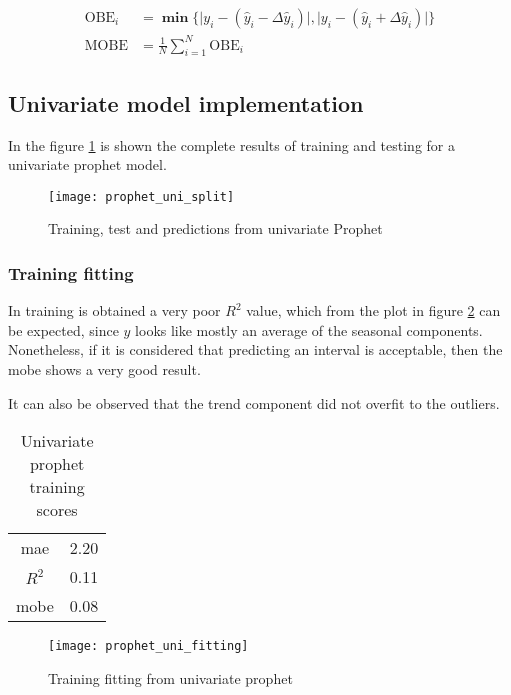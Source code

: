 \begin{align}
\text{OBE}_i &= \bm{\min} \Big\{ \big| y_i - (\hat{y}_i - \Delta\hat{y}_i) \big| , \big	| y_i - (\hat{y}_i + \Delta\hat{y}_i) \big| \Big\} \label{eq:obe} \\
\text{MOBE} &= \frac{1}{N} \sum_{i=1}^{N}{ \text{OBE}_i }\label{eq:mobe}
\end{align}

\subsection{Univariate model implementation}

In the figure \ref{fig:prophet_uni_split} is shown the complete results of training and testing for a univariate prophet model.

\begin{figure}[H]
	\centering
	\texttt{[image: prophet\_uni\_split]}
	\caption{Training, test and predictions from univariate Prophet}
	\label{fig:prophet_uni_split}
\end{figure}

\subsubsection*{Training fitting}

In training is obtained a very poor $R^2$ value, which from the plot in figure \ref{fig:prophet_uni_fitting} can be expected, since $\hat{y}$ looks like mostly an average of the seasonal components. Nonetheless, if it is considered that predicting an interval is acceptable, then the \ac{mobe} shows a very good result. 

It can also be observed that the trend component did not overfit to the outliers.

\begin{table}[H]
	\centering
	\begin{tabular}{|c|c|}
		\hline
		\ac{mae} 	& 2.20 \\
		$R^2$ 		& 0.11 \\
		\ac{mobe} 	& 0.08 \\
		\hline
	\end{tabular}
	\caption{Univariate prophet training scores}
	\label{table:prophet_uni_train_scores}
\end{table}

\begin{figure}[H]
	\centering
	\texttt{[image: prophet\_uni\_fitting]}
	\caption{Training fitting from univariate prophet}
	\label{fig:prophet_uni_fitting}
\end{figure}

